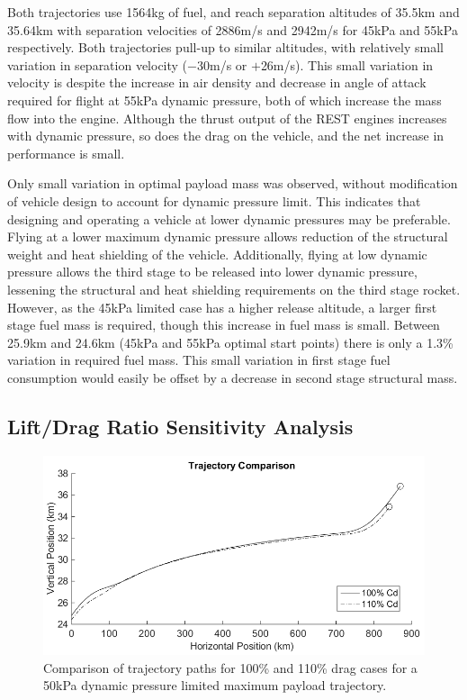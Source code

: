\documentclass[]{aiaa-tc}
\newcommand{\FirstStageAltFortyFive}{25.9}
\newcommand{\FirstStageAltFiftyFive}{24.6}
\newcommand{\SeparationAltFortyFivekPa}{35.5}
\newcommand{\SeparationAltFiftyFivekPa}{35.64}
\newcommand{\SeparationvFortyFivekPa}{2886}
\newcommand{\SeparationvFiftyFivekPa}{2942}
\begin{document}
 

 Both trajectories use 1564kg of fuel, and reach separation altitudes of \SeparationAltFortyFivekPa km and \SeparationAltFiftyFivekPa km with separation velocities of \SeparationvFortyFivekPa m/s and \SeparationvFiftyFivekPa m/s for 45kPa and 55kPa respectively.  
 Both trajectories pull-up to similar altitudes, with relatively small variation in separation velocity ($-$30m/s or $+$26m/s).
  This small variation in velocity is despite the increase in air density and decrease in angle of attack required for flight at 55kPa dynamic pressure, both of which increase the mass flow into the engine. Although the thrust output of the REST engines increases with dynamic pressure, so does the drag on the vehicle, and the net increase in performance is small. 


Only small variation in optimal payload mass was observed, without modification of vehicle design to account for dynamic pressure limit. This indicates that designing and operating a vehicle at lower dynamic pressures may be preferable. Flying at a lower maximum dynamic pressure allows reduction of the structural weight and heat shielding of the vehicle. Additionally, flying at low dynamic pressure allows the third stage to be released into lower dynamic pressure, lessening the structural and heat shielding requirements on the third stage rocket. However, as the 45kPa limited case has a higher release altitude, a larger first stage fuel mass is required, though this increase in fuel mass is small. Between \FirstStageAltFortyFive km  and \FirstStageAltFiftyFive km (45kPa and 55kPa optimal start points) there is only a 1.3\% variation in required fuel mass. This small variation in first stage fuel consumption would easily be offset by a decrease in second stage structural mass. 




\subsection{Lift/Drag Ratio Sensitivity Analysis}\label{subsection:dragvariation}
\begin{figure}[ht]
	\centering
	\includegraphics[width=.7\linewidth]{DragComparisonTraj}
	\caption{Comparison of trajectory paths for 100\% and 110\% drag cases for a 50kPa dynamic pressure limited maximum payload trajectory.}
	\label{fig:DragCompTraj}
\end{figure}
\end{document}
